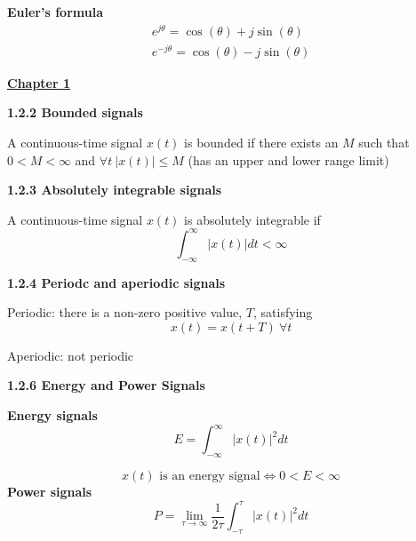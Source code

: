 \documentclass[landscape,a4paper]{extarticle}
\begin{document}
\fontsize{7}{9}\selectfont
\begin{multicols*}{5}
    \textbf{Euler's formula}
    \begin{align*}
        e^{j\theta}=\cos(\theta) + j\sin(\theta)\\
        e^{-j\theta}=\cos(\theta)-j\sin(\theta)
    \end{align*}

    \textbf{\uline{Chapter 1}}

    \textbf{1.2.2 Bounded signals}

    A continuous-time signal $x(t)$ is bounded if there exists an $M$ such that $0 < M < \infty$ and $\forall t \ |x(t)| \leq M$ (has an upper and lower range limit)

    \textbf{1.2.3 Absolutely integrable signals}

    A continuous-time signal $x(t)$ is absolutely integrable if 
    \[
        \int_{-\infty}^{\infty}|x(t)| dt < \infty
    \]

    \textbf{1.2.4 Periodc and aperiodic signals}

    Periodic: there is a non-zero positive value, $T$, satisfying 
    \[
        x(t)=x(t+T) \ \forall t \tag{1.1}
    \]

    Aperiodic: not periodic

    \textbf{1.2.6 Energy and Power Signals}

    \textbf{Energy signals}
    \[
        E = \int_{-\infty}^{\infty}|x(t)|^2 dt \tag{1.3a}
    \]
    
    \[
        x(t) \text{ is an energy signal} \iff 0 < E < \infty \tag{1.3b}
    \]
    \textbf{Power signals}
    \[
        P = \lim_{\tau \to \infty}\frac{1}{2\tau}\int_{-\tau}^{\tau}|x(t)|^2dt \tag{1.4a}
    \]


\end{multicols*}
\end{document}
